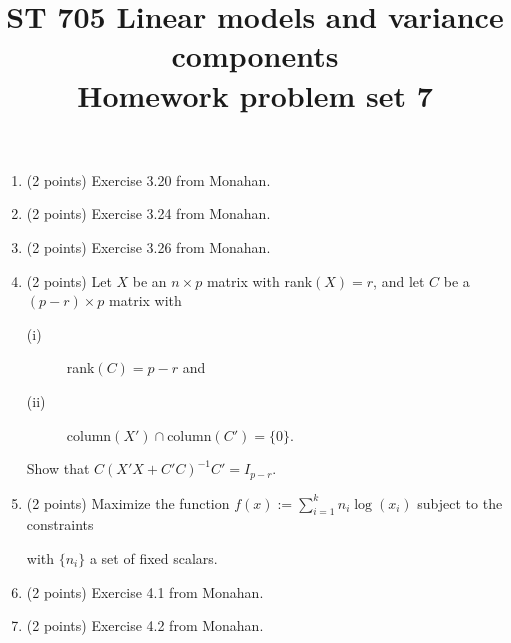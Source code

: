 \documentclass[11pt]{article}
\title{ST 705 Linear models and variance components \\ 
        Homework problem set 7}
\begin{document}
\maketitle

\begin{enumerate}

\item(2 points) Exercise 3.20 from Monahan.

\item(2 points) Exercise 3.24 from Monahan.

\item(2 points) Exercise 3.26 from Monahan.

\item(2 points)  Let $X$ be an $n\times p$ matrix with rank$(X) = r$, and let $C$ be a $(p-r)\times p$ matrix with 
\begin{description}
\item[(i)] rank$(C) = p-r$ and
\item[(ii)] $\text{column}(X') \cap \text{column}(C') = \{0\}$.
\end{description}
Show that $C(X'X + C'C)^{-1}C' = I_{p-r}$.

\item(2 points) Maximize the function $f(x) := \sum_{i=1}^{k}n_{i}\log(x_{i})$ subject to the constraints
with $\{n_{i}\}$ a set of fixed scalars.

\item(2 points) Exercise 4.1 from Monahan.

\item(2 points) Exercise 4.2 from Monahan.

\end{enumerate}
\end{document}
